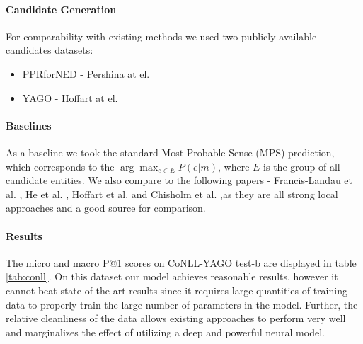 \documentclass[11pt]{article}
\begin{document}
\paragraph{Candidate Generation}
For comparability with existing methods we used two publicly available candidates datasets:
\begin{itemize}
	\item PPRforNED - Pershina at el. 
	\item YAGO - Hoffart at el. 
\end{itemize}

\paragraph{Baselines}
As a baseline we took the standard Most Probable Sense (MPS) prediction, which corresponds to the $\arg\max_{e\in{{E}}}{P(e|m)}$, where $E$ is the group of all candidate entities.
We also compare to the following papers - Francis-Landau et al. , He et al. , Hoffart et al.  and Chisholm et al.  ,as they are all strong local approaches and a good source for comparison.

\paragraph{Results}
The micro and macro P@1 scores on CoNLL-YAGO test-b are displayed in table \ref{tab:conll}. On this dataset our model achieves reasonable results, however it cannot beat state-of-the-art results since it requires large quantities of training data to properly train the large number of parameters in the model.  Further, the relative cleanliness of the data allows existing approaches to perform very well and marginalizes the effect of utilizing a deep and powerful neural model.
\end{document}
